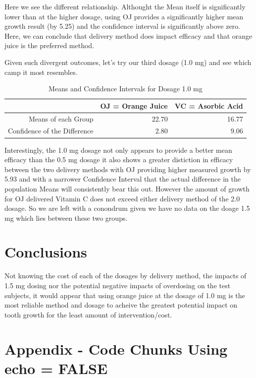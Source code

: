 \documentclass[]{article}
\begin{document}
Here we see the different relationship. Althought the Mean itself is
significantly lower than at the higher dosage, using OJ provides a
significantly higher mean growth result (by 5.25) and the confidence
interval is significantly above zero. Here, we can conclude that
delivery method does impact efficacy and that orange juice is the
preferred method.

Given such divergent outcomes, let's try our third dosage (1.0 mg) and
see which camp it most resembles.

\begin{table}[ht]
\centering
\begin{tabular}{rrr}
  \hline
 & OJ = Orange Juice & VC = Asorbic Acid \\ 
  \hline
Means of each Group & 22.70 & 16.77 \\ 
  Confidence of the Difference & 2.80 & 9.06 \\ 
   \hline
\end{tabular}
\caption{Means and Confidence Intervals for Dosage 1.0 mg} 
\end{table}

Interestingly, the 1.0 mg dosage not only appears to provide a better
mean efficacy than the 0.5 mg dosage it also shows a greater distiction
in efficacy between the two delivery methods with OJ providing higher
measured growth by 5.93 and with a narrower Confidence Interval that the
actual difference in the population Means will consistently bear this
out. However the amount of growth for OJ delivered Vitamin C does not
exceed either delivery method of the 2.0 dosage. So we are left with a
conondrum given we have no data on the doage 1.5 mg which lies between
these two groups.

\section{Conclusions}\label{conclusions}

Not knowing the cost of each of the dosages by delivery method, the
impacts of 1.5 mg dosing nor the potential negative impacts of
overdosing on the test subjects, it would appear that using orange juice
at the dosage of 1.0 mg is the most reliable method and dosage to
acheive the greatest potential impact on tooth growth for the least
amount of intervention/cost.

\section{Appendix - Code Chunks Using echo =
FALSE}\label{appendix---code-chunks-using-echo-false}
\end{document}
